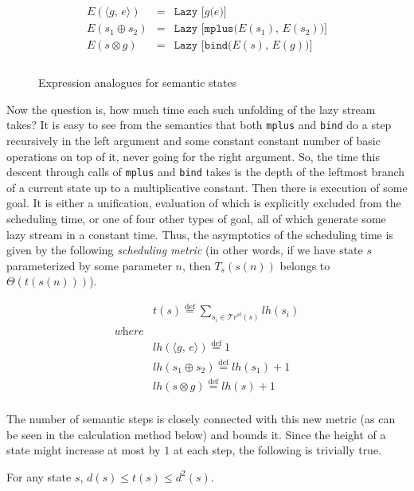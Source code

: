\documentclass[acmsmall, anonymous, review]{acmart}
\newcommand{\eqdef}{\overset{\mathrm{def}}{=}}
\newcommand{\taskst}[2]{\langle #1 ,\, #2 \rangle}
\newcommand{\lazystream}[1]{\texttt{Lazy [{#1}]}}
\newcommand{\trs}[1]{\mathcal{T}r^{st}(#1)}
\newcommand{\expranalog}[1]{E(#1)}
\begin{document}
\begin{figure}[t]
\[
\begin{array}{lcl}
  \expranalog{\taskst{g}{e}} &=& \lazystream{$g$($e$)} \\
  \expranalog{s_1 \oplus s_2} &=& \lazystream{mplus($\expranalog{s_1}$, $\expranalog{s_2}$)} \\
  \expranalog{s \otimes g} &=& \lazystream{bind($\expranalog{s}$, $\expranalog{g}$)} \\ \\
\end{array}
\]
  \caption{Expression analogues for semantic states}
  \label{fig:expression_analogue}
\end{figure}

Now the question is, how much time each such unfolding of the lazy stream takes? It is easy to see from the semantics that both \texttt{mplus} and \texttt{bind} do a step recursively in the left argument and some constant constant number of basic operations on top of it, never going for the right argument. So, the time this descent through calls of \texttt{mplus} and \texttt{bind} takes is the depth of the leftmost branch of a current state up to a multiplicative constant. Then there is execution of some goal. It is either a unification, evaluation of which is explicitly excluded from the scheduling time, or one of four other types of goal, all of which generate some lazy stream in a constant time. Thus, the asymptotics of the scheduling time is given by the following \emph{scheduling metric} (in other words, if we have state $s$ parameterized by some parameter $n$, then $T_s(s(n))$ belongs to $\Theta(t(s(n)))$).

\[ \begin{array}{ll}
 & t(s) \eqdef \sum\limits_{s_i \in \trs{s}} lh(s_i) \\
 \textit{where} & \\
 & lh(\taskst{g}{e}) \eqdef 1 \\
 & lh(s_1 \oplus s_2) \eqdef lh(s_1) + 1 \\
 & lh(s \otimes g) \eqdef lh(s) + 1 \\
\end{array} \]

The number of semantic steps is closely connected with this new metric (as can be seen in the calculation method below) and bounds it. Since the height of a state might increase at most by $1$ at each step, the following is trivially true.

\begin{lemma}
For any state $s$, $d(s) \le t(s) \le d^2(s)$.
\end{lemma}
\end{document}
